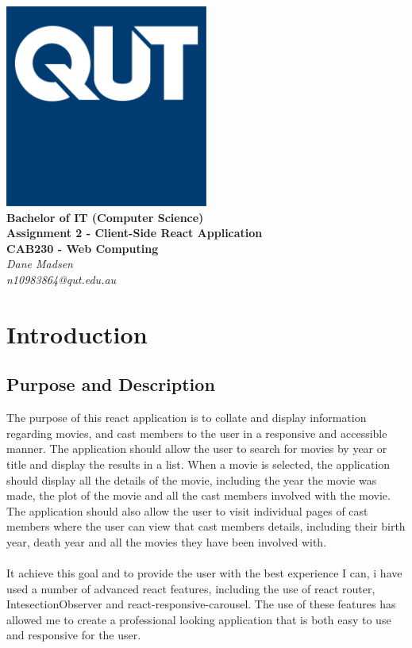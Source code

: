 \documentclass[12pt,a4paper]{article}
\begin{document}
	\begin{titlepage}
		
		\begin{center}
			\includegraphics[width=0.5\textwidth]{QUT.jpg}\\
			[0.03\textheight]  
			\Large\textbf{Bachelor of IT (Computer Science)}\\
			\Large\textbf{Assignment 2 - Client-Side React Application}\\
			\large\textbf{CAB230 - Web Computing}\\
			[0.02\textheight]
			\large\textsl{Dane Madsen}\\
			\large\textsl{n10983864@qut.edu.au}
		\end{center}
		
	\end{titlepage}
	\tableofcontents
	\newpage
	
	\section{Introduction}
		\subsection{Purpose and Description}
			The purpose of this react application is to collate and display information regarding movies, 
			and cast members to the user in a responsive and accessible manner. The application should 
			allow the user to search for movies by year or title and display the results in a list. 
			When a movie is selected, the application should display all the details of the movie, 
			including the year the movie was made, the plot of the movie and all the cast members 
			involved with the movie. The application should also allow the user to visit individual 
			pages of cast members where the user can view that cast members details, including their 
			birth year, death year and all the movies they have been involved with.\\
			\\
			It achieve this goal and to provide the user with the best experience I can, i have used a 
			number of advanced react features, including the use of react router, IntesectionObserver and 
			react-responsive-carousel. The use of these features has allowed me to create a 
			professional looking application that is both easy to use and responsive for the user.\\
\end{document}
